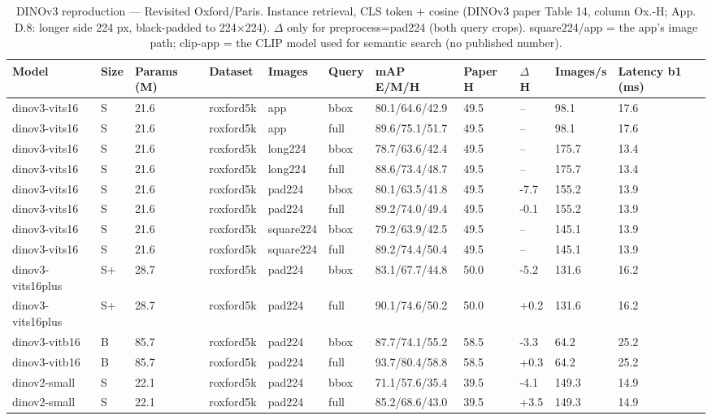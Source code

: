 \begin{table}[ht]
\centering
\small
\caption{DINOv3 reproduction — Revisited Oxford/Paris. Instance retrieval, CLS token + cosine (DINOv3 paper Table 14, column Ox.-H; App. D.8: longer side 224 px, black-padded to 224$\times$224). $\Delta$ only for preprocess=pad224 (both query crops). square224/app = the app's image path; clip-app = the CLIP model used for semantic search (no published number).}
\begin{tabular}{lllllllllll}
\toprule
Model & Size & Params (M) & Dataset & Images & Query & mAP E/M/H & Paper H & $\Delta$ H & Images/s & Latency b1 (ms) \\
\midrule
dinov3-vits16 & S & 21.6 & roxford5k & app & bbox & 80.1/64.6/42.9 & 49.5 & – & 98.1 & 17.6 \\
dinov3-vits16 & S & 21.6 & roxford5k & app & full & 89.6/75.1/51.7 & 49.5 & – & 98.1 & 17.6 \\
dinov3-vits16 & S & 21.6 & roxford5k & long224 & bbox & 78.7/63.6/42.4 & 49.5 & – & 175.7 & 13.4 \\
dinov3-vits16 & S & 21.6 & roxford5k & long224 & full & 88.6/73.4/48.7 & 49.5 & – & 175.7 & 13.4 \\
dinov3-vits16 & S & 21.6 & roxford5k & pad224 & bbox & 80.1/63.5/41.8 & 49.5 & -7.7 & 155.2 & 13.9 \\
dinov3-vits16 & S & 21.6 & roxford5k & pad224 & full & 89.2/74.0/49.4 & 49.5 & -0.1 & 155.2 & 13.9 \\
dinov3-vits16 & S & 21.6 & roxford5k & square224 & bbox & 79.2/63.9/42.5 & 49.5 & – & 145.1 & 13.9 \\
dinov3-vits16 & S & 21.6 & roxford5k & square224 & full & 89.2/74.4/50.4 & 49.5 & – & 145.1 & 13.9 \\
dinov3-vits16plus & S+ & 28.7 & roxford5k & pad224 & bbox & 83.1/67.7/44.8 & 50.0 & -5.2 & 131.6 & 16.2 \\
dinov3-vits16plus & S+ & 28.7 & roxford5k & pad224 & full & 90.1/74.6/50.2 & 50.0 & +0.2 & 131.6 & 16.2 \\
dinov3-vitb16 & B & 85.7 & roxford5k & pad224 & bbox & 87.7/74.1/55.2 & 58.5 & -3.3 & 64.2 & 25.2 \\
dinov3-vitb16 & B & 85.7 & roxford5k & pad224 & full & 93.7/80.4/58.8 & 58.5 & +0.3 & 64.2 & 25.2 \\
dinov2-small & S & 22.1 & roxford5k & pad224 & bbox & 71.1/57.6/35.4 & 39.5 & -4.1 & 149.3 & 14.9 \\
dinov2-small & S & 22.1 & roxford5k & pad224 & full & 85.2/68.6/43.0 & 39.5 & +3.5 & 149.3 & 14.9 \\

\end{tabular}
\end{table}
